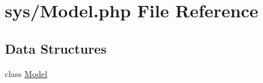 \hypertarget{_model_8php}{}\section{sys/\+Model.php File Reference}
\label{_model_8php}
\subsection*{Data Structures}
\begin{DoxyCompactItemize}
\item 
class \hyperlink{class_model}{Model}
\end{DoxyCompactItemize}
